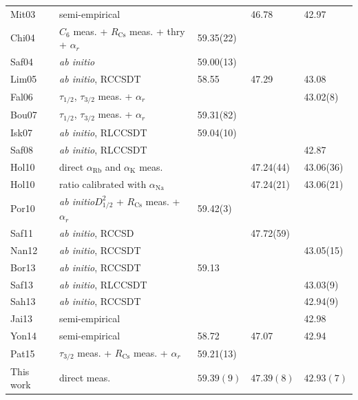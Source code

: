 \documentclass[twocolumn,pra,showpacs,superscriptaddress,longbibliography]{revtex4-1}   %
\newcommand{\ak}{\alpha_{\textrm{K}}}
\newcommand{\arb}{\alpha_{\textrm{Rb}}}
\newcommand{\polKSysOnly}{42.93(7)}
\newcommand{\polRbSysOnly}{47.39(8)}
\newcommand{\polCsSysOnly}{59.39(9)}
\newcommand{\rcs}{R_{\mathrm{Cs}}}
\newcommand{\abinit}{\textit{ab initio}}
\begin{document}
\begin{table}
\begin{center}
\begin{tabular}{l l l l l}
Mit03 \cite{Mitroy2003} & semi-empirical & & 46.78 & 42.97 \\ %
Chi04 \cite{Chin2004,Rafac1998,Derevianko2001} & $C_6$ meas. + $\rcs$ meas. + thry + $\alpha_r$ & 59.35(22) & & \\
Saf04 \cite{Safronova2004} & \abinit & 59.00(13) & & \\
Lim05 \cite{Lim2005} & \abinit, RCCSDT & 58.55 & 47.29 & 43.08 \\ %
Fal06 \cite{Falke2006a,Safronova2006}  & $\tau_{1/2}$, $\tau_{3/2}$ meas. + $\alpha_r$& & & 43.02(8) \\
Bou07 \cite{Bouloufa2007,Derevianko2001} & $\tau_{1/2}$, $\tau_{3/2}$ meas. + $\alpha_r$ & 59.31(82) & & \\
Isk07 \cite{Iskrenova-Tchoukova2007} & \abinit, RLCCSDT & 59.04(10) & & \\ %
Saf08 \cite{Safronova2008} & \abinit, RLCCSDT & & & 42.87 \\ %
Hol10 \cite{Holmgren2010} & direct $\arb$ and $\ak$ meas. & & 47.24(44) & 43.06(36) \\
Hol10 \cite{Holmgren2010,Ekstrom1995} & ratio calibrated with $\alpha_{\text{Na}}$ & & 47.24(21) & 43.06(21) \\
Por10 \cite{Porsev2010,Rafac1998,Derevianko2001} & \abinit $D_{1/2}^2$ + $\rcs$ meas. + $\alpha_r$ & 59.42(3) & & \\
Saf11 \cite{Safronova2011} & \abinit, RCCSD & & 47.72(59) & \\ %
Nan12 \cite{Nandy2012} & \abinit, RCCSDT & & & 43.05(15) \\ %
Bor13 \cite{Borschevsky2013} & \abinit, RCCSDT & 59.13 & & \\ %
Saf13 \cite{Safronova2013} & \abinit, RLCCSDT & & & 43.03(9) \\ %
Sah13 \cite{Sahoo2013} & \abinit, RCCSDT & & & 42.94(9) \\ %
Jai13 \cite{Jiang2013} & semi-empirical & & & 42.98 \\
Yon14 \cite{Y.-B.2014} & semi-empirical & 58.72 & 47.07 & 42.94 \\
Pat15 \cite{Patterson2015,Rafac1998,Derevianko2001}  & $\tau_{3/2}$ meas. + $\rcs$ meas. + $\alpha_r$ & 59.21(13) & & \\
This work & direct meas. & $\polCsSysOnly$ & $\polRbSysOnly$ & $\polKSysOnly$ \\
\hline\hline
\end{tabular}
\end{center}
\end{table}
\endgroup
\end{document}
